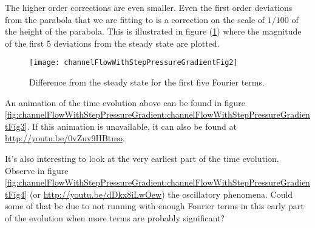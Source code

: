 The higher order corrections are even smaller.  Even the first order deviations from the parabola that we are fitting to is a correction on the scale of $1/100$ of the height of the parabola.  This is illustrated in figure (\ref{fig:channelFlowWithStepPressureGradient:channelFlowWithStepPressureGradientFig2}) where the magnitude of the first 5 deviations from the steady state are plotted.

\begin{figure}[htp]
   \centering
   \texttt{[image: channelFlowWithStepPressureGradientFig2]}
   \caption{Difference from the steady state for the first five Fourier terms.}
   \label{fig:channelFlowWithStepPressureGradient:channelFlowWithStepPressureGradientFig2}
\end{figure}

An animation of the time evolution above can be found in figure \ref{fig:channelFlowWithStepPressureGradient:channelFlowWithStepPressureGradientFig3}.  If this animation is unavailable, it can also be found at \href{http://youtu.be/0vZuv9HBtmo}{http://youtu.be/0vZuv9HBtmo}.


It's also interesting to look at the very earliest part of the time evolution.  Observe in figure \ref{fig:channelFlowWithStepPressureGradient:channelFlowWithStepPressureGradientFig4} (or \href{http://youtu.be/dDkx8iLwOew}{http://youtu.be/dDkx8iLwOew}) the oscillatory phenomena.  Could some of that be due to not running with enough Fourier terms in this early part of the evolution when more terms are probably significant?


\EndArticle
